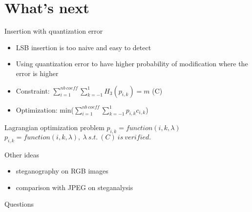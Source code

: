 \documentclass[11pt,compress]{beamer} %
\begin{document}
\section{What's next}
\begin{frame}{Insertion with quantization error}
  \begin{itemize}
    \item LSB insertion is too naive and easy to detect
    \item Using quantization error to have higher probability of modification where the error is higher
    \item Constraint: $\sum_{i=1}^{nb\ coeff}{\sum_{k=-1}^{1}{H_3(p_{i,k})}} = m$ (C)
    \item Optimization: min($\sum_{i=1}^{nb\ coeff}{\sum_{k=-1}^{1}{p_{i,k}c_{i,k}}}$)
  \end{itemize}
  Lagrangian optimization problem
  \centering
  $p_{i,k} = function(i,k,\lambda)$
  $\boxed{p_{i,k} = function(i,k,\lambda),\ \lambda\ s.t.\ (C)\ is\ verified.}$
\end{frame}

\begin{frame}{Other ideas}
  \begin{itemize}
    \item steganography on RGB images
    \item comparison with JPEG on steganalysis
  \end{itemize}
\end{frame}

\begin{frame}
  \centering
  Questions
\end{frame}
\end{document}
